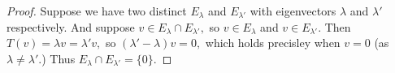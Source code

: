 \begin{proof}
    Suppose we have two distinct $E_\lambda$ and $E_{\lambda'}$ with eigenvectors $\lambda$ and $\lambda'$ respectively. And suppose $v\in E_{\lambda} \cap E_{\lambda'},$ so $v\in E_{\lambda}$ and $v\in E_{\lambda'}.$ Then $T(v)=\lambda v=\lambda'v,$ so $(\lambda' - \lambda)v=0,$ which holds precisley when $v=0$ (as $\lambda\neq\lambda'.$) Thus $E_{\lambda} \cap E_{\lambda'} = \{0\}.$
\end{proof}